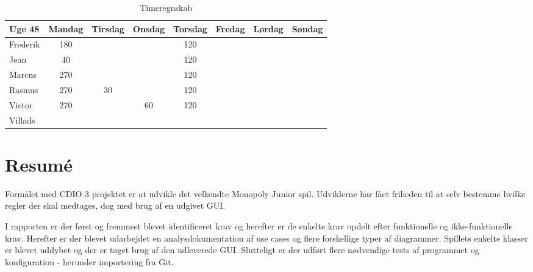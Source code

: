 \begin{table}[H]
\begin{tabular}{@{}lccccccc@{}}
\toprule
Uge 48   & Mandag & Tirsdag & Onsdag & Torsdag & Fredag & Lørdag & Søndag \\ \midrule
Frederik &  180  &    &    &120    &    &    &    \\
Jean     &  40  &    &    &   120 &    &    &    \\
Marcus   &  270 &    &    &  120  &    &    &    \\
Rasmus   &  270 &    30 &    &  120  &    &    &    \\
Victor   &  270 &    &  60  &  120  &    &    &    \\
Villads  &    &    &    &    &    &    &    \\ \bottomrule
\end{tabular}
\caption{Timeregnskab}
\end {table}

\clearpage


\section*{Resumé}

Formålet med CDIO 3 projektet er at udvikle det velkendte Monopoly Junior spil. Udviklerne har fået friheden til at selv bestemme hvilke regler der skal medtages, dog med brug af en udgivet GUI. 

I rapporten er der først og fremmest blevet identificeret krav og herefter er de enkelte krav opdelt efter funktionelle og ikke-funktionelle krav. Herefter er der blevet udarbejdet en analysdokumentation af use cases og flere forskellige typer af diagrammer. Spillets enkelte klasser er blevet uddybet og der er 
taget brug af den udleverede GUI. Slutteligt er der udført flere nødvendige tests af programmet og konfiguration - herunder importering fra Git. 




